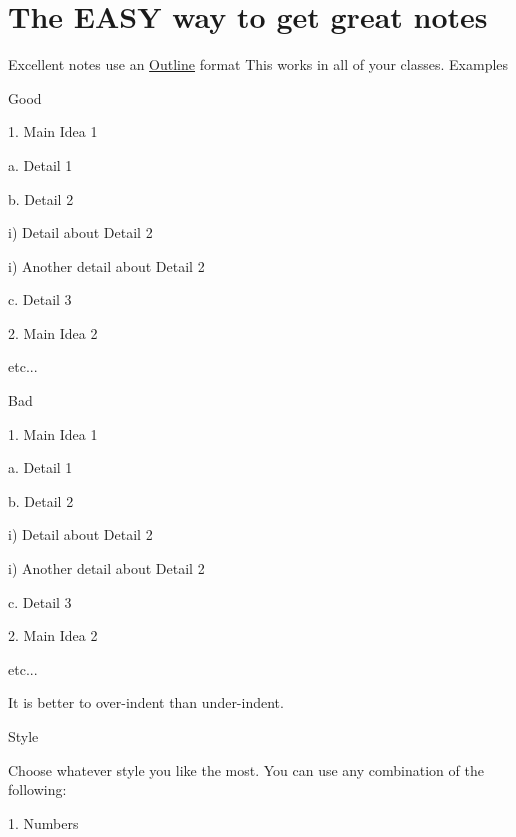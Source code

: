 \documentclass[../../main.tex]{subfiles}
\begin{document}
\section{The EASY way to get great notes}

\begin{outline}[enumerate]

\1 Excellent notes use an \underline{Outline} format
	\2	
	\2 This works in all of your classes.
\1 Examples
	\begin{boxGreen}{Good}

	1. Main Idea 1

	\quad a. Detail 1

	\quad b. Detail 2


	\quad \quad i) Detail about Detail 2

	\quad \quad i) Another detail about Detail 2

	\quad c. Detail 3

	2. Main Idea 2

	\quad \quad etc...
	\end{boxGreen}

	\begin{boxRed}{Bad}

	1. Main Idea 1

	a. Detail 1

	b. Detail 2

	i) Detail about Detail 2

	i) Another detail about Detail 2

	c. Detail 3

	2. Main Idea 2

	\quad \quad etc...

	\end{boxRed}


	\1 It is better to over-indent than under-indent.

	\1 Style

		\2 Choose whatever style you like the most.  You can use any combination of the following:

	\begin{displayquote}

	1. Numbers


\end{displayquote}
\end{outline}
\end{document}
